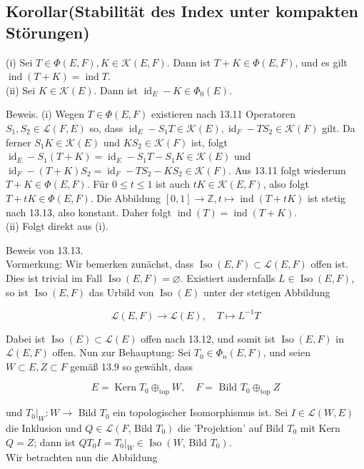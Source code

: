 \documentclass[10pt, letterpaper]{article}
\begin{document}
\subsection*{Korollar(Stabilität des Index unter kompakten Störungen)}
(i) Sei $T \in \Phi(E, F), K \in \mathcal{K}(E, F)$. Dann ist $T+K \in \Phi(E, F)$, und es gilt $\operatorname{ind}(T+ K)=\operatorname{ind} T$.\\
(ii) Sei $K \in \mathcal{K}(E)$. Dann ist $\operatorname{id}_{E}-K \in \Phi_{0}(E)$.

Beweis. (i) Wegen $T \in \Phi(E, F)$ existieren nach 13.11 Operatoren $S_{1}, S_{2} \in \mathcal{L}(F, E)$ so, dass $\operatorname{id}_{E}-S_{1} T \in \mathcal{K}(E), \operatorname{id}_{F}-T S_{2} \in \mathcal{K}(F)$ gilt. Da ferner $S_{1} K \in \mathcal{K}(E)$ und $K S_{2} \in \mathcal{K}(F)$ ist, folgt $\operatorname{id}_{E}-S_{1}(T+K)=\operatorname{id}_{E}-S_{1} T-S_{1} K \in \mathcal{K}(E)$ und $\operatorname{id}_{F}-(T+ K) S_{2}=\operatorname{id}_{F}-T S_{2}-K S_{2} \in \mathcal{K}(F)$. Aus 13.11 folgt wiederum $T+K \in \Phi(E, F)$. Für $0 \leq t \leq 1$ ist auch $t K \in \mathcal{K}(E, F)$, also folgt $T+t K \in \Phi(E, F)$. Die Abbildung $[0,1] \rightarrow \mathbb{Z}, t \mapsto \operatorname{ind}(T+t K)$ ist stetig nach 13.13, also konstant. Daher folgt $\operatorname{ind}(T)= \operatorname{ind}(T+K)$.\\
(ii) Folgt direkt aus (i).

Beweis von 13.13.\\
Vormerkung: Wir bemerken zunächst, dass $\operatorname{Iso}(E, F) \subset \mathcal{L}(E, F)$ offen ist. Dies ist trivial im Fall $\operatorname{Iso}(E, F)=\varnothing$. Existiert andernfalls $L \in \operatorname{Iso}(E, F)$, so ist $\operatorname{Iso}(E, F)$ das Urbild von $\operatorname{Iso}(E)$ unter der stetigen Abbildung

$$
\mathcal{L}(E, F) \rightarrow \mathcal{L}(E), \quad T \mapsto L^{-1} T
$$

Dabei ist $\operatorname{Iso}(E) \subset \mathcal{L}(E)$ offen nach 13.12, und somit ist $\operatorname{Iso}(E, F)$ in $\mathcal{L}(E, F)$ offen. Nun zur Behauptung: Sei $T_{0} \in \Phi_{n}(E, F)$, und seien $W \subset E, Z \subset F$ gemäß 13.9 so gewählt, dass

$$
E=\operatorname{Kern} T_{0} \oplus_{\mathrm{top}} W, \quad F=\text { Bild } T_{0} \oplus_{\mathrm{top}} Z
$$

und $\left.T_{0}\right|_{W}: W \rightarrow$ Bild $T_{0}$ ein topologischer Isomorphismus ist. Sei $I \in \mathcal{L}(W, E)$ die Inklusion und $Q \in \mathcal{L}\left(F\right.$, Bild $\left.T_{0}\right)$ die 'Projektion' auf Bild $T_{0}$ mit Kern $Q=Z$; dann ist $Q T_{0} I=\left.T_{0}\right|_{W} \in \operatorname{Iso}\left(W\right.$, Bild $\left.T_{0}\right)$.\\
Wir betrachten nun die Abbildung
\end{document}
